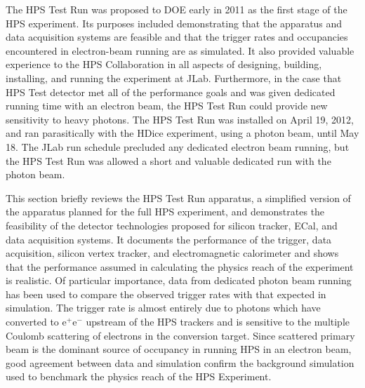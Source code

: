 The HPS Test Run was proposed to DOE early in 2011 as the first stage of the HPS experiment. Its
purposes included demonstrating that the apparatus and data acquisition systems are feasible and
that the trigger rates and occupancies encountered in electron-beam running are as simulated.  It also
provided valuable experience to the HPS Collaboration in all aspects of designing, building, installing,
and running the experiment at JLab. Furthermore, in the case that HPS Test detector met all of the 
performance goals and was given dedicated running time with an electron beam, the HPS Test Run 
could provide new sensitivity to heavy photons. The HPS Test Run was installed on April 19, 2012, and 
ran parasitically with the HDice experiment, using a photon beam, until May 18. The JLab run schedule 
precluded any dedicated electron beam running, but the HPS Test Run was allowed a short and valuable
dedicated run with the photon beam.

This section briefly reviews the HPS Test Run apparatus, a simplified version of the apparatus
planned for the full HPS experiment, and demonstrates the feasibility of the detector
technologies proposed for silicon tracker, ECal, and data acquisition systems. It documents the
performance of the trigger, data acquisition, silicon vertex tracker, and electromagnetic calorimeter
and shows that the performance assumed in calculating the physics reach of the experiment is realistic.
Of particular importance, data from dedicated photon beam running has been used to compare
the observed trigger rates with that expected in simulation. The trigger rate is almost entirely due to
photons which have converted to e$^+$e$^-$ upstream of the HPS trackers and is sensitive to the multiple
Coulomb scattering of electrons in the conversion target.  Since scattered primary beam is the dominant 
source of occupancy in running HPS in an electron beam, good agreement between data and simulation 
confirm the background simulation used to benchmark the physics reach of the HPS Experiment.


